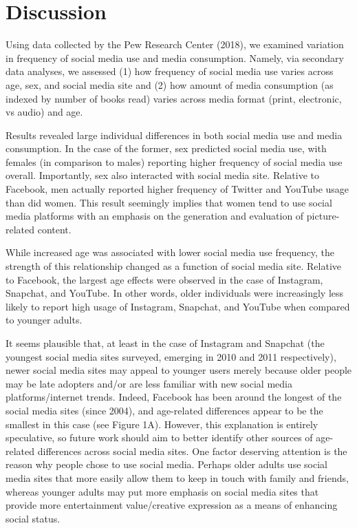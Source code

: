 \documentclass[man, fleqn, noextraspace]{apa6}
\theoremstyle{definition}
\theoremstyle{definition}
\theoremstyle{definition}
\theoremstyle{remark}
\begin{document}
\section{Discussion}\label{discussion}

Using data collected by the Pew Research Center (2018), we examined
variation in frequency of social media use and media consumption.
Namely, via secondary data analyses, we assessed (1) how frequency of
social media use varies across age, sex, and social media site and (2)
how amount of media consumption (as indexed by number of books read)
varies across media format (print, electronic, vs audio) and age.

Results revealed large individual differences in both social media use
and media consumption. In the case of the former, sex predicted social
media use, with females (in comparison to males) reporting higher
frequency of social media use overall. Importantly, sex also interacted
with social media site. Relative to Facebook, men actually reported
higher frequency of Twitter and YouTube usage than did women. This
result seemingly implies that women tend to use social media platforms
with an emphasis on the generation and evaluation of picture-related
content.

While increased age was associated with lower social media use
frequency, the strength of this relationship changed as a function of
social media site. Relative to Facebook, the largest age effects were
observed in the case of Instagram, Snapchat, and YouTube. In other
words, older individuals were increasingly less likely to report high
usage of Instagram, Snapchat, and YouTube when compared to younger
adults.

It seems plausible that, at least in the case of Instagram and Snapchat
(the youngest social media sites surveyed, emerging in 2010 and 2011
respectively), newer social media sites may appeal to younger users
merely because older people may be late adopters and/or are less
familiar with new social media platforms/internet trends. Indeed,
Facebook has been around the longest of the social media sites (since
2004), and age-related differences appear to be the smallest in this
case (see Figure 1A). However, this explanation is entirely speculative,
so future work should aim to better identify other sources of
age-related differences across social media sites. One factor deserving
attention is the reason why people chose to use social media. Perhaps
older adults use social media sites that more easily allow them to keep
in touch with family and friends, whereas younger adults may put more
emphasis on social media sites that provide more entertainment
value/creative expression as a means of enhancing social status.
\end{document}
